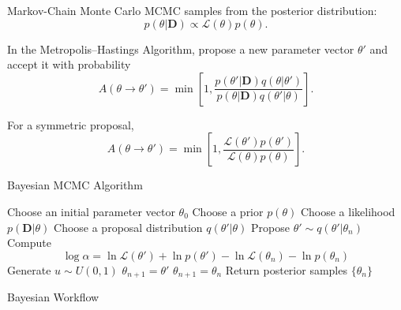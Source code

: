 \documentclass[a4paper, 10pt, onepage]{elegantbook}
\begin{document}
{\begin{frame}{Markov-Chain Monte Carlo}
  MCMC samples from the posterior distribution:
  \[
    p(\theta|\mathbf{D})
    \propto
    \mathcal{L}(\theta)p(\theta).
  \]

  In the Metropolis--Hastings Algorithm, propose a new parameter vector \(\theta'\) and accept it with probability
  \[
    A(\theta\to\theta')
    =
    \min\left[
      1,
      \frac{
        p(\theta'|\mathbf{D})q(\theta|\theta')
      }{
        p(\theta|\mathbf{D})q(\theta'|\theta)
      }
    \right].
  \]

  For a symmetric proposal,
  \[
    A(\theta\to\theta')
    =
    \min\left[
      1,
      \frac{
        \mathcal{L}(\theta')p(\theta')
      }{
        \mathcal{L}(\theta)p(\theta)
      }
    \right].
  \]
\end{frame}

\begin{frame}{Bayesian MCMC Algorithm}
  \begin{algorithmic}[1]
    \State Choose an initial parameter vector \(\theta_0\)
    \State Choose a prior \(p(\theta)\)
    \State Choose a likelihood \(p(\mathbf{D}|\theta)\)
    \State Choose a proposal distribution \(q(\theta'|\theta)\)
      \State Propose \(\theta'\sim q(\theta'|\theta_n)\)
      \State Compute
      \[
        \log\alpha
        =
        \ln\mathcal{L}(\theta')
        +
        \ln p(\theta')
        -
        \ln\mathcal{L}(\theta_n)
        -
        \ln p(\theta_n)
      \]
      \State Generate \(u\sim U(0,1)\)
        \State \(\theta_{n+1}=\theta'\)
      \Else
        \State \(\theta_{n+1}=\theta_n\)
      \EndIf
    \EndFor
    \State Return posterior samples \(\{\theta_n\}\)
  \end{algorithmic}
\end{frame}

\begin{frame}{Bayesian Workflow}
  \centering
\end{frame}}
\end{document}
